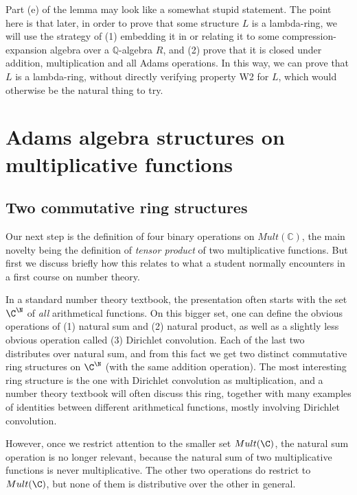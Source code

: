 \documentclass[a4paper]{article}
\begin{document}
\begin{remark}
Part (e) of the lemma may look like a somewhat stupid statement. The point here is that later, in order to prove that some structure $L$ is a lambda-ring, we will use the strategy of (1) embedding it in or relating it to some compression-expansion algebra over a $\mathbb{Q}$-algebra $R$, and (2) prove that it is closed under addition, multiplication and all Adams operations. In this way, we can prove that $L$ is a lambda-ring, without directly verifying property W2 for $L$, which would otherwise be the natural thing to try.
\end{remark}

\section{Adams algebra structures on multiplicative functions}

\subsection{Two commutative ring structures}

Our next step is the definition of four binary operations on $Mult(\mathbb{C})$, the main novelty being the definition of \emph{tensor product} of two multiplicative functions. But first we discuss briefly how this relates to what a student normally encounters in a first course on number theory.

In a standard number theory textbook, the presentation often starts with the set $\C^{\N}$ of \emph{all} arithmetical functions. On this bigger set, one can define the obvious operations of (1) natural sum and (2) natural product, as well as a slightly less obvious operation called (3) Dirichlet convolution. Each of the last two distributes over natural sum, and from this fact we get two distinct commutative ring structures on $\C^{\N}$ (with the same addition operation). The most interesting ring structure is the one with Dirichlet convolution as multiplication, and a number theory textbook will often discuss this ring, together with many examples of identities between different arithmetical functions, mostly involving Dirichlet convolution.

However, once we restrict attention to the smaller set $Mult(\C)$, the natural sum operation is no longer relevant, because the natural sum of two multiplicative functions is never multiplicative. The other two operations do restrict to $Mult(\C)$, but none of them is distributive over the other in general. 
\end{document}
